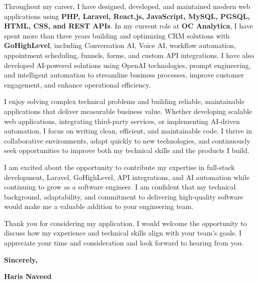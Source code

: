 \documentclass[11pt,letterpaper]{article}
\begin{document}
\vspace{8pt}

Throughout my career, I have designed, developed, and maintained modern web applications using \textbf{PHP, Laravel, React.js, JavaScript, MySQL, PGSQL, HTML, CSS, and REST APIs}. In my current role at \textbf{OC Analytica}, I have spent more than three years building and optimizing CRM solutions with \textbf{GoHighLevel}, including Conversation AI, Voice AI, workflow automation, appointment scheduling, funnels, forms, and custom API integrations. I have also developed AI-powered solutions using OpenAI technologies, prompt engineering, and intelligent automation to streamline business processes, improve customer engagement, and enhance operational efficiency.

\vspace{8pt}

I enjoy solving complex technical problems and building reliable, maintainable applications that deliver measurable business value. Whether developing scalable web applications, integrating third-party services, or implementing AI-driven automation, I focus on writing clean, efficient, and maintainable code. I thrive in collaborative environments, adapt quickly to new technologies, and continuously seek opportunities to improve both my technical skills and the products I build.

\vspace{8pt}

I am excited about the opportunity to contribute my expertise in full-stack development, Laravel, GoHighLevel, API integrations, and AI automation while continuing to grow as a software engineer. I am confident that my technical background, adaptability, and commitment to delivering high-quality software would make me a valuable addition to your engineering team.

\vspace{8pt}

Thank you for considering my application. I would welcome the opportunity to discuss how my experience and technical skills align with your team's goals. I appreciate your time and consideration and look forward to hearing from you.
\vspace{20pt}

\noindent\textbf{Sincerely,}

\vspace{16pt}

\noindent\textbf{\color{primary}Haris Naveed}
\end{document}
